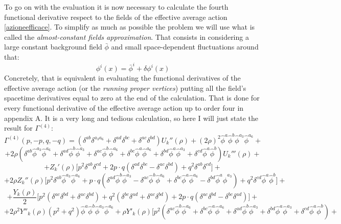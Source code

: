 To go on with the evaluation it is now necessary to calculate the fourth functional derivative respect to the fields of the effective average action
\eqref{azioneefficace}. To simplify as much as possible the problem
we will use what is called the \emph{almost-constant fields approximation}. That consists in considering a large constant background field $\bar{\phi}$ and small 
space-dependent fluctuations around that:
\begin{equation}
 \phi^i(x) = \bar{\phi}^i + \delta \phi^i(x) 
\end{equation}
Concretely, that is equivalent in evaluating the functional derivatives of the effective average action 
(or the \emph{running proper vertices}) putting all the field's spacetime derivatives equal to zero at the end of the calculation.
That is done for every functional derivative of the effective average action up to order four in appendix A. 
It is a very long and tedious calculation, so here I will just state the result for $\Gamma^{(4)}$:
$$\Gamma^{(4)}(p, -p,q, -q) = (\delta^{ab}\delta^{a_3{a_6}} + \delta^{ad}\delta^{bc} + \delta^{ac}\delta^{bd})U_k''(\rho)+(2\rho)^2\widehat{\phi}^a\widehat{\phi}^b\widehat{\phi}^{a_3}\widehat{\phi}^{a_6} +$$
$$+2\rho(\delta^{ab}\widehat{\phi}^{a_3}\widehat{\phi}^{a_6} + \delta^{ad}\widehat{\phi}^b\widehat{\phi}^{a_3} + \delta^{ac}\widehat{\phi}^b\widehat{\phi}^{a_6} + \delta^{bc}\widehat{\phi}^a\widehat{\phi}^{a_6} + \delta^{bd}\widehat{\phi}^a\widehat{\phi}^{a_3} + \delta^{cd}\widehat{\phi}^a\widehat{\phi}^b)U_k'''(\rho) +$$
$$+Z_k'(\rho)\Big[p^2\delta^{ab}\delta^{cd} + 2 p\cdot q(\delta^{ad}\delta^{bc} - \delta^{ac}\delta^{bd}) + q^2\delta^{ab}\delta^{cd}\Big] + $$
$$+2\rho Z_k''(\rho)\Big[p^2\delta^{ab} \widehat{\phi}^{a_3}\widehat{\phi}^{a_6} + p\cdot q(\delta^{ad}\widehat{\phi}^b\widehat{\phi}^{a_3}  - \delta^{ac}\widehat{\phi}^b\widehat{\phi}^{a_6} +\delta^{bc}\widehat{\phi}^a\widehat{\phi}^{a_6} - \delta^{bd}\widehat{\phi}^a\widehat{\phi}^{a_3}) + q^2 \delta^{cd}\widehat{\phi}^a\widehat{\phi}^b \Big] +$$
$$+ \frac{Y_k(\rho)}{2}\Big[p^2(\delta^{ac}\delta^{bd} + \delta^{ac}\delta^{bd}) + q^2(\delta^{bc}\delta^{ad} + \delta^{ac}\delta^{bd}) + 2p\cdot q (\delta^{ac}\delta^{bd} - \delta^{bc}\delta^{ad})\Big] +$$
$$+2\rho^2Y''_k(\rho)(p^2 + q^2)\widehat{\phi}^a\widehat{\phi}^b\widehat{\phi}^{a_3}\widehat{\phi}^{a_6}+\rho Y'_k(\rho)\Big[p^2(\delta^{ac}\widehat{\phi}^b\widehat{\phi}^{a_6} + \delta^{bc}\widehat{\phi}^a\widehat{\phi}^{a_6} + \delta^{ad}\widehat{\phi}^b\widehat{\phi}^{a_3} + \delta^{bd}\widehat{\phi}^a\widehat{\phi}^{a_3} + \delta^{cd}\widehat{\phi}^a\widehat{\phi}^b) + $$
